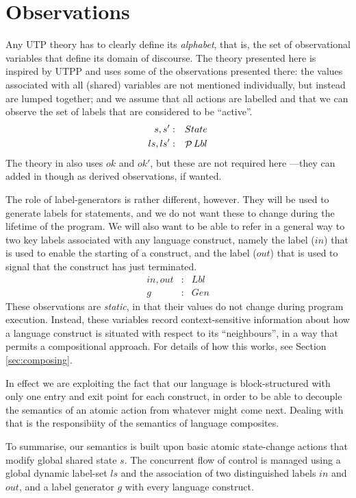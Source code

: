 \section{Observations}\label{sec:observe}

Any UTP theory has to clearly define its \emph{alphabet},
that is, the set of observational variables that define
its domain of discourse.
The theory presented here is inspired by UTPP\cite{DBLP:conf/icfem/WoodcockH02}
and uses some of the observations presented there:
the values associated with all (shared) variables
are not mentioned individually, but instead are lumped together;
and we assume that all actions are labelled and that we can observe
the set of labels that are considered to be ``active''.
\begin{eqnarray}
   s, s' &:& State
\\ ls, ls' &:& \mathop{\mathcal P} Lbl
\end{eqnarray}
The theory in \cite{DBLP:conf/icfem/WoodcockH02} also uses $ok$ and $ok'$,
but these are not required here
---they can added in though as derived observations, if wanted.

The role of label-generators is rather different, however.
They will be used to generate labels for statements,
and we do not want these to change during the lifetime of the program.
We will also want to be able to refer in a general way to two key labels
associated with any language construct,
namely the label ($in$) that is used to enable the starting of a construct,
and the label ($out$) that is used to signal that the construct has just terminated.
\begin{eqnarray}
   in, out &:& Lbl
\\ g &:& Gen
\end{eqnarray}
These observations are \emph{static},
in that their values do not change during program execution.
Instead, these variables record context-sensitive information about
how a language construct is situated with respect to its ``neighbours'',
in a way that permits a compositional approach.
For details of how this works, see Section \ref{sec:composing}.


In effect we are exploiting the fact that our language is block-structured
with only one entry and exit point for each construct,
in order to be able to decouple the semantics of an atomic action
from whatever might come next.
Dealing with that is the responsibiity of the semantics of language composites.


To summarise,
our semantics is built upon basic atomic state-change
actions that modify global shared state $s$.
The concurrent flow of control is managed using a global dynamic label-set $ls$
and the association of two distinguished labels $in$ and $out$,
and a label generator $g$ with every language construct.

